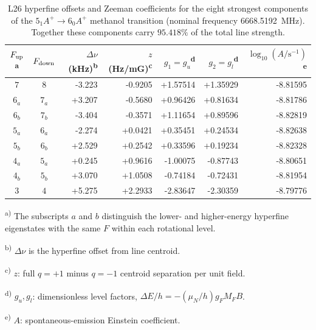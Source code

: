 \begin{table}[!tp]
\begingroup
\centering
\small
\setlength{\tabcolsep}{6pt}
\caption{L26 hyperfine offsets and Zeeman
coefficients for the eight strongest components of the
$5_1 A^+\rightarrow6_0 A^+$ methanol transition
(nominal frequency 6668.5192~MHz).
Together these components carry $95.418\%$ of the total
line strength.}
\label{tab:zeeman-67}
\begin{tabular*}{\textwidth}{@{\extracolsep{\fill}}ccrrrrr@{}}
\toprule
$F_{\rm up}$\textsuperscript{a} & $F_{\rm down}$ & $\Delta\nu$ (kHz)\textsuperscript{b} & $z$ (Hz/mG)\textsuperscript{c} & $g_1=g_u$\textsuperscript{d} & $g_2=g_l$\textsuperscript{d} & $\log_{10}(A/\mathrm{s}^{-1})$\textsuperscript{e}\\
\midrule
$7$ & $8$ & -3.223 & -0.9205 & +1.57514 & +1.35929 & -8.81595\\
$6_{a}$ & $7_{a}$ & +3.207 & -0.5680 & +0.96426 & +0.81634 & -8.81786\\
$6_{b}$ & $7_{b}$ & -3.404 & -0.3571 & +1.11654 & +0.89596 & -8.82819\\
$5_{a}$ & $6_{a}$ & -2.274 & +0.0421 & +0.35451 & +0.24534 & -8.82638\\
$5_{b}$ & $6_{b}$ & +2.529 & +0.2542 & +0.33596 & +0.19234 & -8.82328\\
$4_{a}$ & $5_{a}$ & +0.245 & +0.9616 & -1.00075 & -0.87743 & -8.80651\\
$4_{b}$ & $5_{b}$ & +3.070 & +1.0508 & -0.74184 & -0.72431 & -8.81954\\
$3$ & $4$ & +5.275 & +2.2933 & -2.83647 & -2.30359 & -8.79776\\
\bottomrule
\end{tabular*}

\par\vspace{3pt}
\begin{minipage}{\linewidth}
\footnotesize\raggedright
\textsuperscript{a)} The subscripts $a$ and $b$ distinguish the lower- and higher-energy
hyperfine eigenstates with the same $F$ within each rotational level.\par
\textsuperscript{b)} $\Delta\nu$ is the hyperfine offset from line centroid.
 \par
\textsuperscript{c)} $z$: full $q=+1$ minus $q=-1$ centroid separation per unit field.\par
\textsuperscript{d)} $g_u,g_l$: dimensionless level factors, $\Delta E/h=-(\mu_N/h)g_FM_FB$.\par
\textsuperscript{e)} $A$: spontaneous-emission Einstein coefficient.\par
\end{minipage}
\par\endgroup
\end{table}
